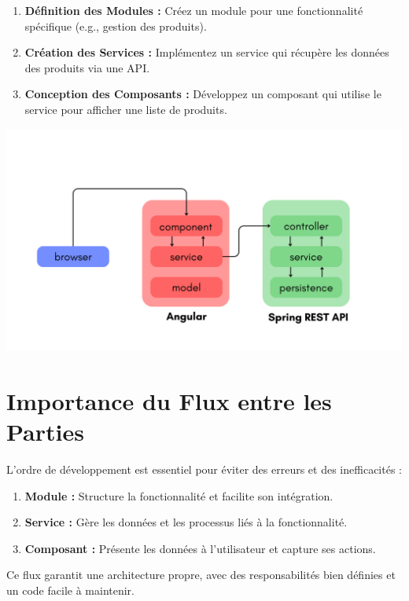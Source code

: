\documentclass{article}
\begin{document}
\begin{enumerate}
    \item \textbf{Définition des Modules :}  
    Créez un module pour une fonctionnalité spécifique (e.g., gestion des produits).
    \item \textbf{Création des Services :}  
    Implémentez un service qui récupère les données des produits via une API.
    \item \textbf{Conception des Composants :}  
    Développez un composant qui utilise le service pour afficher une liste de produits.
\end{enumerate}
\begin{tcolorbox}[colframe=black!70, colback=white, title=Figure 4:  Flux d’Information, fonttitle=\bfseries]
\centering
\includegraphics[width=\textwidth]{images/angular_spring_diagram.png}
\end{tcolorbox}
\section{Importance du Flux entre les Parties}

L’ordre de développement est essentiel pour éviter des erreurs et des inefficacités :
\begin{enumerate}
    \item \textbf{Module :} Structure la fonctionnalité et facilite son intégration.
    \item \textbf{Service :} Gère les données et les processus liés à la fonctionnalité.
    \item \textbf{Composant :} Présente les données à l’utilisateur et capture ses actions.
\end{enumerate}

Ce flux garantit une architecture propre, avec des responsabilités bien définies et un code facile à maintenir.
\end{document}
